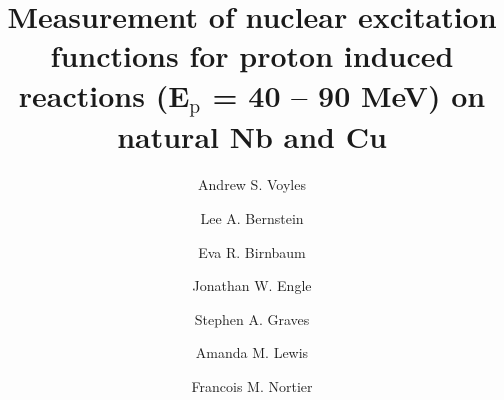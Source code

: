 \documentclass[3p]{elsarticle}
\begin{document}
\begin{frontmatter}


\title{Measurement of nuclear excitation functions for proton induced reactions (E$_{\text{p}}$ = 40 -- 90 MeV) on natural Nb and Cu}




\author[ucb]{Andrew S. Voyles }

% 
% 
% 


\author[ucb,lbl]{Lee A. Bernstein}


\author[lanl]{Eva R. Birnbaum}

\author[uwm]{Jonathan W. Engle}

\author[iowa]{Stephen A. Graves}

\author[ucb]{Amanda M. Lewis}


\author[lanl]{Francois M. Nortier}

% 






\end{frontmatter}
\end{document}
